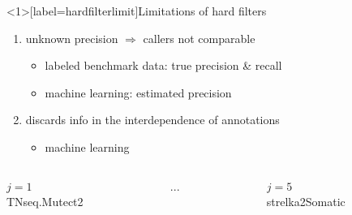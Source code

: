 \documentclass{beamer}
\begin{document}
\begin{frame}<1>[label=hardfilterlimit]{Limitations of hard filters}
\begin{enumerate}
\item<1-> unknown precision \(\Rightarrow\) callers not comparable
\begin{itemize}
\item<3-> labeled benchmark data: true precision \& recall
\item<4-> machine learning: estimated precision
\end{itemize}
\item<2-> discards info in the interdependence of annotations
\begin{itemize}
\item<4-> machine learning
\end{itemize}
\end{enumerate}
\begin{columns}[t]
\begin{column}{0.33\textwidth}

\begin{center}
\(j=1\)\\
TNseq.Mutect2
\end{center}
\end{column}

\begin{column}{0.33\textwidth}

\begin{center}
...
\end{center}

\end{column}

\begin{column}{0.33\textwidth}

\begin{center}
\(j=5\) \\
strelka2Somatic
\end{center}
\end{column}
\end{columns}
\end{frame}
\end{document}
